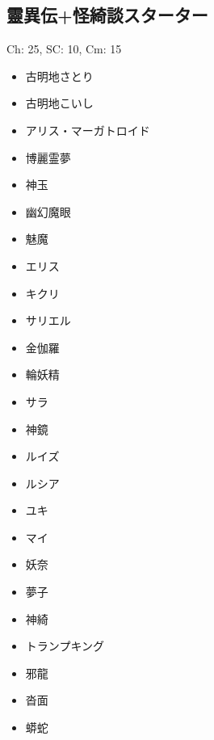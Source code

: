 \documentclass[line_length=22zw,number_of_lines=45,twocolumn]{jlreq}
\begin{document}
\subsection{靈異伝+怪綺談スターター}
Ch: 25, SC: 10, Cm: 15
\begin{itemize}
	\item 古明地さとり
	\item 古明地こいし
	\item アリス・マーガトロイド
	\item 博麗霊夢
	\item 神玉
	\item 幽幻魔眼
	\item 魅魔
	\item エリス
	\item キクリ
	\item サリエル
	\item 金伽羅
	\item 輪妖精
	\item サラ
	\item 神鏡
	\item ルイズ
	\item ルシア
	\item ユキ
	\item マイ
	\item 妖奈
	\item 夢子
	\item 神綺
	\item トランプキング
	\item 邪龍
	\item 沓面
	\item 蟒蛇
\end{itemize}
\pagebreak
\end{document}
